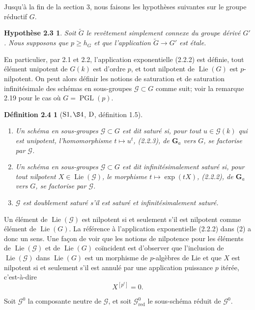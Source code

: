 \documentclass[11pt]{article}
\newtheorem*{hypothese23}{Hypothèse 2.3}
\newtheorem*{definition24}{Définition 2.4}
\newcommand{\Ga}{\mathbf G_a}
\newcommand{\Lie}{\operatorname{Lie}}
\newcommand{\red}{\mathrm{red}}
\begin{document}
Jusqu'à la fin de la section 3, nous faisons les hypothèses suivantes sur le groupe
réductif \(G\).

\begin{hypothese23}
Soit \(\widetilde G\) le revêtement simplement connexe du groupe dérivé \(G'\).
Nous supposons que \(p\ge h_G\) et que l'application \(\widetilde G\to G'\) est étale.
\end{hypothese23}

En particulier, par 2.1 et 2.2, l'application exponentielle (2.2.2) est définie, tout
élément unipotent de \(G(k)\) est d'ordre \(p\), et tout nilpotent de \(\Lie(G)\) est
\(p\)-nilpotent. On peut alors définir les notions de saturation et de saturation
infinitésimale des schémas en sous-groupes \(\mathcal G\subset G\) comme suit; voir
la remarque 2.19 pour le cas où \(G=\operatorname{PGL}(p)\).

\begin{definition24}[\({\rm S1},\S4\), \({\rm D}\), définition 1.5]
\begin{enumerate}[label=(\arabic*),leftmargin=2em]
\item Un schéma en sous-groupes \(\mathcal G\subset G\) est dit saturé si, pour tout
\(u\in \mathcal G(k)\) qui est unipotent, l'homomorphisme \(t\mapsto u^t\), (2.2.3),
de \(\Ga\) vers \(G\), se factorise par \(\mathcal G\).
\item Un schéma en sous-groupes \(\mathcal G\subset G\) est dit infinitésimalement
saturé si, pour tout nilpotent \(X\in\Lie(\mathcal G)\), le morphisme
\(t\mapsto \exp(tX)\), (2.2.2), de \(\Ga\) vers \(G\), se factorise par
\(\mathcal G\).
\item \(\mathcal G\) est doublement saturé s'il est saturé et infinitésimalement saturé.
\end{enumerate}
\end{definition24}

Un élément de \(\Lie(\mathcal G)\) est nilpotent si et seulement s'il est nilpotent
comme élément de \(\Lie(G)\). La référence à l'application exponentielle (2.2.2) dans
(2) a donc un sens. Une façon de voir que les notions de nilpotence pour les éléments
de \(\Lie(\mathcal G)\) et de \(\Lie(G)\) coïncident est d'observer que l'inclusion de
\(\Lie(\mathcal G)\) dans \(\Lie(G)\) est un morphisme de \(p\)-algèbres de Lie et que
\(X\) est nilpotent si et seulement s'il est annulé par une application puissance \(p\)
itérée, c'est-à-dire
\[
  X^{[p^\ell]}=0.
\]

Soit \(\mathcal G^0\) la composante neutre de \(\mathcal G\), et soit
\(\mathcal G^0_{\red}\) le sous-schéma réduit de \(\mathcal G^0\).
\end{document}
